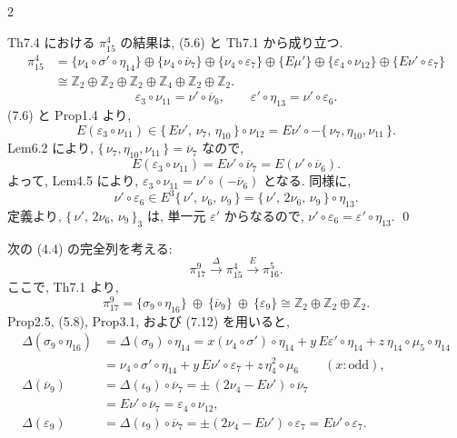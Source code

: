 \documentclass[10pt, leqno]{ltjsarticle}
\newcommand{\ov}[1]{\overline{#1}}
\newcommand{\toda}[1]{\{\,#1\,\}}              %
\newcommand{\todai}[2][]{\{\,#2\,\}_{#1}}      %
\newcommand{\gen}[1]{\{#1\}}       %
\newcommand{\pit}[2]{\pi_{#1}^{#2}}
\numberwithin{equation}{section}
\theoremstyle{plain}
\theoremstyle{definition}
\theoremstyle{remark}
\begin{document}
\begin{paracol}{2}

Th7.4 における \(\pit{15}{4}\) の結果は, (5.6) と Th7.1 から成り立つ. 
\[
\begin{align*}
  \pit{15}{4} 
    & = \gen{\nu_{4}\circ \sigma'\circ\eta_{14}} \oplus \gen{\nu_{4}\circ \overline{\nu}_{7}}
    \oplus \gen{\nu_{4}\circ \varepsilon_{7}} \oplus \gen{E \mu'}
    \oplus \gen{\varepsilon_4\circ\nu_{12}} \oplus \gen{E\nu'\circ\varepsilon_7}\\
    & \cong \mathbb Z_{2}\oplus\mathbb Z_{2}\oplus\mathbb Z_{2}\oplus\mathbb Z_{4}
    \oplus\mathbb Z_{2}\oplus\mathbb Z_{2}.
\end{align*}
\]
%
\begin{equation}
\varepsilon_3\circ\nu_{11} = \nu'\circ\ov{\nu}_6,\qquad
\varepsilon'\circ\eta_{13} = \nu'\circ\varepsilon_6 .
\end{equation}
(7.6) と Prop1.4 より,
\[
  E(\varepsilon_{3}\circ \nu_{11})
  \in \toda{E\nu',\,\nu_{7},\,\eta_{10}} \circ \nu_{12}
  = E\nu'\circ -\toda{\nu_{7}, \eta_{10}, \nu_{11}}.
\]
Lem6.2 により, 
\(\toda{\nu_{7},\eta_{10},\nu_{11}} = \ov{\nu}_7\) なので, 
\[
E(\varepsilon_3\circ\nu_{11}) 
= E\nu'\circ\ov{\nu}_7
= E(\nu'\circ\ov{\nu}_6).
\]
よって,  Lem4.5 により,
\(\varepsilon_{3}\circ \nu_{11}=\nu'\circ(-\overline{\nu}_{6})\) となる. 
同様に,
\[
  \nu'\circ \varepsilon_{6}
  \in E^{3}\toda{\nu',\,\nu_{6},\,\nu_{9}}
  =\toda{\nu',\,2\nu_{6},\,\nu_{9}}\circ\eta_{13}.
\]
定義より, \(\todai[3]{\nu',\,2\nu_{6},\,\nu_{9}}\) 
は, 単一元 \(\varepsilon'\) からなるので,
\(\nu'\circ \varepsilon_{6}=\varepsilon'\circ\eta_{13}\). 
\qed

次の (4.4) の完全列を考える:
\[
  \pit{17}{9}\xrightarrow{\ \Delta\ }\pit{15}{4}\xrightarrow{\ E\ }\pit{16}{5}.
\]
ここで, Th7.1 より,
\[
  \pit{17}{9}=\gen{\sigma_{9}\circ\eta_{16}}\ \oplus\ \gen{\overline{\nu}_{9}}\ \oplus\ \gen{\varepsilon_{9}}
  \cong\mathbb Z_{2}\oplus\mathbb Z_{2}\oplus\mathbb Z_{2}.
\]
Prop2.5, (5.8),  Prop3.1, および (7.12) を用いると,
\[
\begin{aligned}
  \Delta(\sigma_{9}\circ\eta_{16})
    &=\Delta(\sigma_{9})\circ\eta_{14}
      =x(\nu_{4}\circ\sigma')\circ\eta_{14}
      +y\,E\varepsilon'\circ\eta_{14}
      +z\,\eta_{14}\circ\mu_{5}\circ\eta_{14}\\
    &=\nu_{4}\circ\sigma'\circ\eta_{14}
    +y\,E\nu'\circ\varepsilon_{7}
    +z\,\eta_{4}^2\circ\mu_{6}
      \qquad(x:\text{odd}),\\[2pt]
  \Delta(\overline{\nu}_{9})
    &=\Delta(\iota_{9})\circ\overline{\nu}_{7}
      =\pm\,(2\nu_{4} - E\nu')\circ\overline{\nu}_{7}\\
    & = E\nu'\circ\ov{\nu}_7 = \varepsilon_4\circ\nu_{12},\\
  \Delta(\varepsilon_{9})
   & =\Delta(\iota_{9})\circ\overline{\nu}_{7}
   = \pm(2\nu_{4}-E\nu')\circ \varepsilon_{7}
   = E\nu'\circ \varepsilon_{7}.
  \end{aligned}
\]


\end{paracol}
\end{document}
